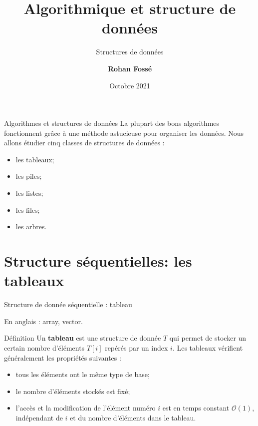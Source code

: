 \documentclass[10pt,xcolor=dvipsnames]{beamer}
\title{
Algorithmique et structure de données
}
\subtitle{Structures de données}
\date{\centering 11 Octobre 2021}
\author{\centering \bf Rohan Fossé}
\begin{document}
\maketitle



\begin{frame}{Algorithmes et structures de données}
    La plupart des bons algorithmes fonctionnent grâce à une méthode astucieuse pour organiser les données. Nous allons étudier cinq classes de structures de données :
    \begin{itemize}
        \item les \alert{tableaux};
        \item les \alert{piles};
        \item les \alert{listes};
        \item les \alert{files};
        \item les \alert{arbres}.
    \end{itemize}
\end{frame}

\section{Structure séquentielles: les tableaux}

\begin{frame}{Structure de donnée séquentielle : tableau}

En anglais : array, vector.

\begin{exampleblock}{Définition}
    Un \textbf{tableau} est une structure de donnée $T$ qui permet de stocker un certain nombre d'éléments $T[i]$ repérés par un index $i$. Les tableaux vérifient généralement les propriétés suivantes :
    \begin{itemize}
        \item tous les éléments ont le même type de base;
        \item le nombre d'éléments stockés est fixé;
        \item l'accès et la modification de l'élément numéro $i$ est en temps constant $\mathcal{O}(1)$, indépendant de $i$ et du nombre d'éléments dans le tableau.
    \end{itemize}
\end{exampleblock}
    
\end{frame}
\end{document}
